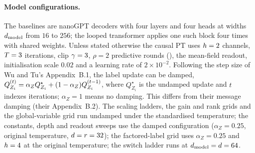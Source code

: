 \paragraph{Model configurations.}
The baselines are nanoGPT decoders with four layers and four heads at widths $d_{\text{model}}$ from
$16$ to $256$; the looped transformer applies one such block four times with shared weights.
Unless stated otherwise the causal PT uses $h=2$ channels, $T=3$ iterations, clip
$\gamma=3$, $\rho=2$ predictive rounds (), the mean-field readout,
initialisation scale $0.02$ and a learning rate of $2\times10^{-2}$. Following the step size of
Wu and Tu's Appendix~B.1, the label update can be damped,
$Q_{Z_{i}}^{(t)} = \alpha_Z Q^{\star}_{Z_i} + (1-\alpha_Z)Q_{Z_{i}}^{(t-1)}$, where $Q^{\star}_{Z_i}$
is the undamped update and $t$ indexes iterations; $\alpha_Z=1$ means no damping. This differs
from their message damping (their Appendix~B.2). The scaling ladders, the gain and rank grids
and the global-variable grid run undamped under the standardised temperature; the constants,
depth and readout sweeps use the damped configuration ($\alpha_Z=0.25$, original temperature,
$d=r=32$); the factored-label grid uses $\alpha_Z=0.25$ and $h=4$ at the original
temperature; the switch ladder runs at $d_{\text{model}}=d=64$.
